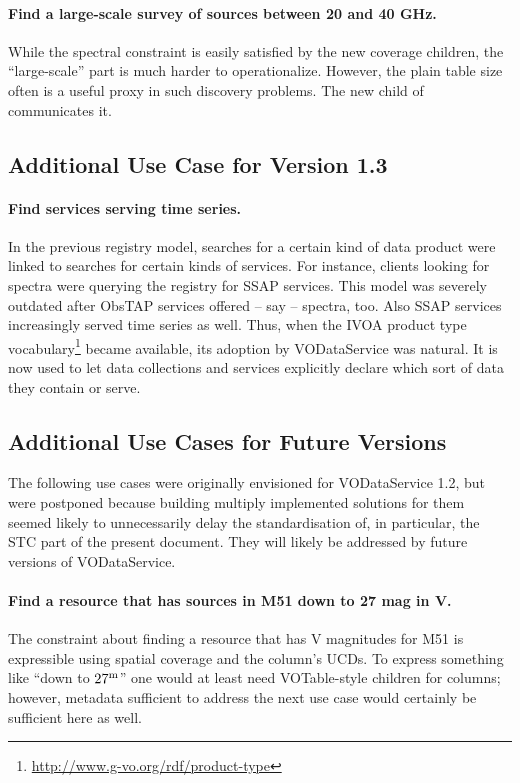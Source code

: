 \documentclass[11pt,a4paper]{ivoa}
\begin{document}
\paragraph{Find a large-scale survey of sources between 20 and 40 GHz.}
While the spectral constraint is easily satisfied by the new coverage
children, the ``large-scale'' part is much harder to operationalize.
However, the plain table size often is a useful proxy in such discovery
problems.  The new  child of  communicates
it.

\subsection{Additional Use Case for Version 1.3}

\paragraph{Find services serving time series.} In the previous registry
model, searches for a certain kind of data product were linked to
searches for certain kinds of services.  For instance, clients looking
for spectra were querying the registry for SSAP services.  This model
was severely outdated after ObsTAP services offered -- say -- spectra,
too.  Also SSAP services increasingly served time series as well.  Thus,
when the IVOA product type
vocabulary\footnote{\url{http://www.g-vo.org/rdf/product-type}} became
available, its adoption by VODataService was natural.  It is now used
to let data collections and services explicitly declare which sort of
data they contain or serve.

\subsection{Additional Use Cases for Future Versions}

The following use cases were originally envisioned for VODataService
1.2, but were postponed because building multiply implemented solutions
for them seemed likely to unnecessarily delay the standardisation of, in
particular, the STC part of the present document.  They will likely be
addressed by future versions of VODataService.

\paragraph{Find a resource that has sources in M51 down to 27 mag in V.}
The constraint about finding a resource that has V magnitudes for M51 is
expressible using spatial coverage and the column's UCDs.  To express
something like ``down to $27^{\rm m}$'' one would at least need
VOTable-style  children for columns; however, metadata
sufficient to address the next use case would certainly be sufficient
here as well.
\end{document}
